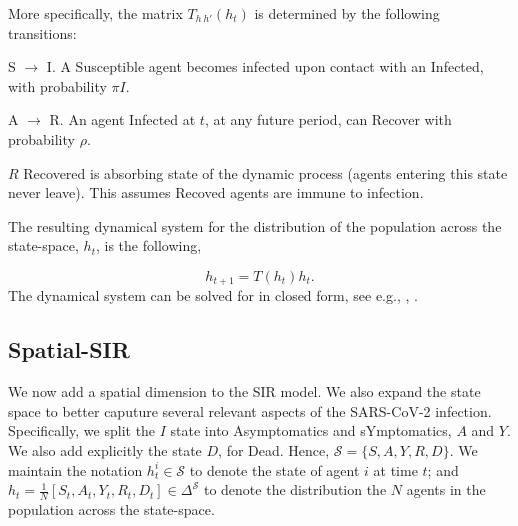 \documentclass[english,11pt]{article}
\begin{document}
More specifically, the matrix $T_{h \: h'}(h_t)$ is determined by the following transitions: 

S $\longrightarrow$ I. A Susceptible agent becomes infected
 upon contact with an Infected, with probability $\pi I$. 

A $\longrightarrow$ R. An  agent Infected at $t$, at any future period, can  Recover with probability $\rho$.

$R$ Recovered is absorbing state of the dynamic process (agents entering this state never leave). This assumes Recoved agents are immune to infection. \newline 

 The resulting dynamical system for the distribution of the population across the state-space, $h_t$, is the following, 

$$ h_{t+1}=T(h_t)h_t.$$
The dynamical system can be solved for in closed form, see e.g.,  \cite{Moll2020}, \cite{neumeyer2020clase}.


\subsection{Spatial-SIR \label{sec:app_theorySS}} We now add a spatial dimension to the SIR model. We also expand the state space to better caputure several relevant aspects of the  SARS-CoV-2 infection. Specifically, we split the $I$ state into Asymptomatics and sYmptomatics, $A$ and $Y$. We also add explicitly the state $D$, for Dead. Hence,  $\mathcal{S}=\{S, A, Y, R, D\}$. We maintain the notation  $h^i_t \in \mathcal{S}$ to denote the state of agent $i$ at time $t$; and $h_t=\frac{1}{N}[S_t,A_t,Y_t,R_t,D_t] \in \Delta^{\mathcal{S}}$ to denote the distribution  the $N$ agents in the  population across the state-space. 
\end{document}

